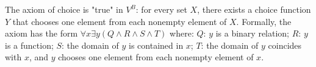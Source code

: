 The axiom of choice is "true" in $V^B$: for every set $X$, there exists a choice function $Y$ that chooses one element from each nonempty element of $X$. Formally, the axiom has the form $\forall x \exists y(Q \wedge R \wedge S \wedge T)$ where:
$Q$: $y$ is a binary relation;
$R$: $y$ is a function;
$S$: the domain of $y$ is contained in $x$;
$T$: the domain of $y$ coincides with $x$, and $y$ chooses one element from each nonempty element of $x$.